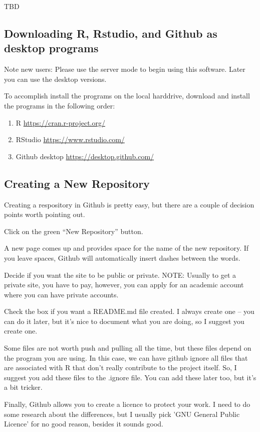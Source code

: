 \documentclass[12pt]{../SOP4_alpha}\usepackage[]{graphicx}\usepackage[]{color}
\begin{document}
TBD

\subsection{Downloading R, Rstudio, and Github as desktop programs}

\NP Note new users: Please use the server mode to begin using this software. Later you can use the desktop versions. 

\NP To accomplish install the programs on the local harddrive, download and install the programs in the following order: 

\begin{enumerate}
  \item R \url{https://cran.r-project.org/}
  \item RStudio \url{https://www.rstudio.com/}
  \item Github desktop \url{https://desktop.github.com/}
\end{enumerate}

\subsection{Creating a New Repository}

\NP Creating a respository in Github is pretty easy, but there are a couple of decision points worth pointing out.

\NP Click on the green ``New Repository'' button.

\NP A new page comes up and provides space for the name of the new repository. If you leave spaces, Github will automatically insert dashes between the words.

\NP Decide if you want the site to be public or private. NOTE: Usually to get a private site, you have to pay, however, you can apply for an academic account where you can have private accounts. 

\NP Check the box if you want a README.md file created. I always create one -- you can do it later, but it's nice to document what you are doing, so I suggest you create one.

\NP Some files are not worth push and pulling all the time, but these files depend on the program you are using. In this case, we can have github ignore all files that are associated with R that don't really contribute to the project itself. So, I suggest you add these files to the .ignore file. You can add these later too, but it's a bit tricker.

\NP Finally, Github allows you to create a licence to protect your work. I need to do some research about the differences, but I usually pick 'GNU General Public Licence' for no good reason, besides it sounds good.
\end{document}
